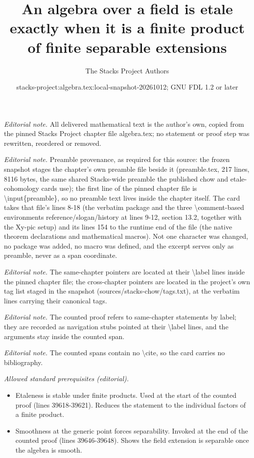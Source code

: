 \documentclass[10pt,a4paper]{amsart}
\title{An algebra over a field is etale exactly when it is a finite product of finite separable extensions}
\author{The Stacks Project Authors}
\date{stacks-project:algebra.tex:local-snapshot-20261012; GNU FDL 1.2 or later}
\theoremstyle{plain}
\theoremstyle{definition}
\theoremstyle{remark}
\numberwithin{equation}{subsection}
\begin{document}
\maketitle
\noindent\textit{Editorial note.} All delivered mathematical text is the author's own, copied from the pinned Stacks Project chapter file algebra.tex; no statement or proof step was rewritten, reordered or removed.\par\medskip
\noindent\textit{Editorial note.} Preamble provenance, as required for this source: the frozen snapshot stages the chapter's own preamble file beside it (preamble.tex, 217 lines, 8116 bytes, the same shared Stacks-wide preamble the published chow and etale-cohomology cards use); the first line of the pinned chapter file is \textbackslash{}input\{preamble\}, so no preamble text lives inside the chapter itself. The card takes that file's lines 8-18 (the verbatim package and the three \textbackslash{}comment-based environments reference/slogan/history at lines 9-12, section 13.2, together with the Xy-pic setup) and its lines 154 to the runtime end of the file (the native theorem declarations and mathematical macros). Not one character was changed, no package was added, no macro was defined, and the excerpt serves only as preamble, never as a span coordinate.\par\medskip
\noindent\textit{Editorial note.} The same-chapter pointers are located at their \textbackslash{}label lines inside the pinned chapter file; the cross-chapter pointers are located in the project's own tag list staged in the snapshot (sources/stacks-chow/tags.txt), at the verbatim lines carrying their canonical tags.\par\medskip
\noindent\textit{Editorial note.} The counted proof refers to same-chapter statements by label; they are recorded as navigation stubs pointed at their \textbackslash{}label lines, and the arguments stay inside the counted span.\par\medskip
\noindent\textit{Editorial note.} The counted spans contain no \textbackslash{}cite, so the card carries no bibliography.\par\medskip
\noindent\textit{Allowed standard prerequisites (editorial).}\begin{itemize}
\item Etaleness is stable under finite products. Used at the start of the counted proof (lines 39618-39621). Reduces the statement to the individual factors of a finite product.
\item Smoothness at the generic point forces separability. Invoked at the end of the counted proof (lines 39646-39648). Shows the field extension is separable once the algebra is smooth.
\end{itemize}\medskip
\end{document}
